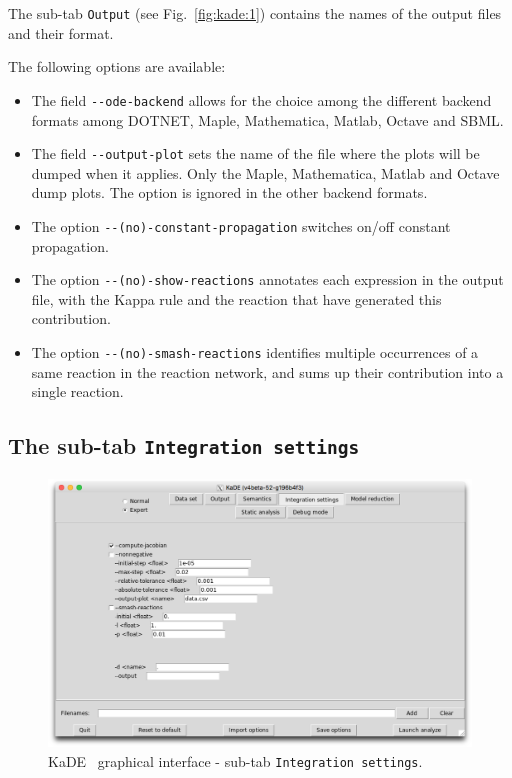 \documentclass[11pt]{book}
\def\KaDE{\textsf{KaDE}}
\begin{document}
The sub-tab \texttt{Output} (see Fig.~\ref{fig:kade:1}) contains the names of the output files and their format.

The following options are available:
\begin{itemize}
\item The field \texttt{-{}-ode-backend} allows for the choice among the different backend formats among DOTNET, Maple, Mathematica, Matlab, Octave and SBML.
\item The field \texttt{-{}-output-plot} sets the name of the file where the plots will be dumped when it applies. Only the Maple, Mathematica, Matlab and Octave dump plots. The option is ignored in the other backend formats.
\item The option \texttt{-{}-(no)-constant-propagation} switches on/off constant propagation.
\item The option \texttt{-{}-(no)-show-reactions} annotates each expression in the output file, with the Kappa rule and the reaction that have generated this contribution.
\item The option \texttt{-{}-(no)-smash-reactions} identifies multiple occurrences of a same reaction in the reaction network, and sums up  their contribution into a single reaction.
\end{itemize}

\subsection{The sub-tab \texttt{Integration settings}}

\begin{figure}[htbp]
\centering
\includegraphics[width=12cm,bb=0 0 1904 1208]{img/kade_3.png}
\caption{\KaDE~ graphical interface - sub-tab \texttt{Integration settings}.}
\label{fig:kade:3}
\end{figure}
\end{document}
